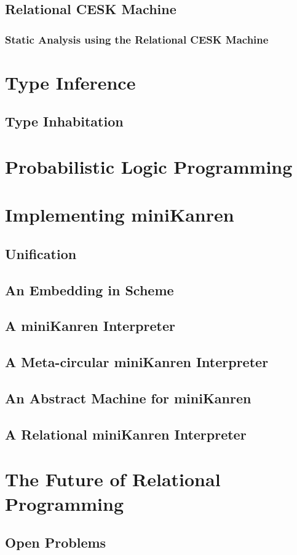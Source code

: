 \documentclass[onecolumn, 11pt, oneside, openright]{book}
\begin{document}
\begin{schemeregion}
\section{Relational CESK Machine}
\subsection{Static Analysis using the Relational CESK Machine}

\chapter{Type Inference}
\section{Type Inhabitation}

\chapter{Probabilistic Logic Programming}

\chapter{Implementing miniKanren}
\section{Unification}
\section{An Embedding in Scheme}
\section{A miniKanren Interpreter}
\section{A Meta-circular miniKanren Interpreter}
\section{An Abstract Machine for miniKanren}
\section{A Relational miniKanren Interpreter}

\chapter{The Future of Relational Programming}
\section{Open Problems}



\appendix

\end{schemeregion}
\end{document}
